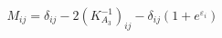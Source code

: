\begin{equation}
M_{ij}=\delta _{ij}-2(K_{A_{3}}^{-1})_{ij}-\delta _{ij}(1+e^{\varepsilon
_{i}})~
\end{equation}

